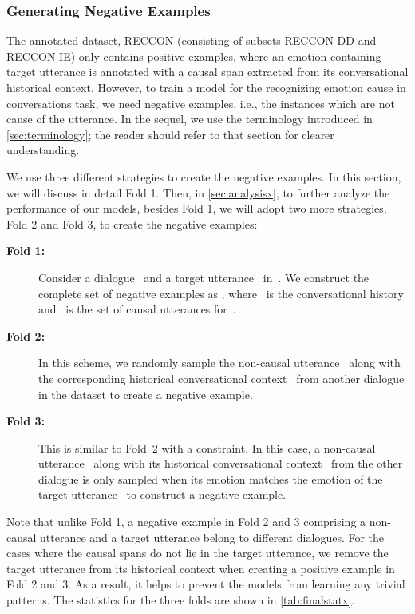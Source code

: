 \documentclass[smallextended]{svjour3}
\newcommand\RECCON{recognizing emotion cause in conversations} \newcommand\ECRIC{ECRIC}
\newcommand\RECCONDA{RECCON}
\newcommand\RECCONDADD{RECCON-DD}
\newcommand\RECCONDAIE{RECCON-IE}
\newcommand\0{\hphantom{0}}
\begin{document}
\subsubsection{Generating Negative Examples}
\label{sec:neg}
The annotated dataset, \RECCONDA{} (consisting of subsets \RECCONDADD{} and \RECCONDAIE{}) only contains positive examples, where an emotion-containing target utterance is annotated with a causal span extracted from its conversational historical context. However, to train a model for the \RECCON{} task, we need negative examples, i.e., the instances which are not cause of the utterance. In the sequel, we use the terminology introduced in \cref{sec:terminology}; the reader should 
refer to that section for clearer understanding.

We use three different strategies to create the negative examples.
In this section, we will discuss in detail Fold 1. Then, in \cref{sec:analysisx}, to further analyze the performance of our models, besides Fold 1, we will adopt two more strategies, Fold 2 and Fold 3, to create the negative examples:
\begin{description}
\item[\textbf{Fold 1:}] Consider a dialogue~ and a target utterance~ in~.
We construct the complete set of negative examples as 
,
where~ is the conversational history and~ is the set of causal utterances for~.
\item[\textbf{Fold 2:}] In this scheme, we randomly sample the non-causal utterance~ along with the corresponding historical conversational context~ from another dialogue in the dataset to create a negative example.
\item[\textbf{Fold 3:}] This is similar to Fold~2 with a constraint. In this case, a non-causal utterance~ along with its historical conversational context~ from the other dialogue is only sampled when its emotion matches the emotion of the target utterance~ to construct a negative example.
\end{description}
Note that unlike Fold 1, a negative example in Fold 2 and 3 comprising a non-causal utterance  and a target utterance  belong to different dialogues. For the cases where the causal spans do not lie in the target utterance, we remove the target utterance from its historical context when creating a positive example in Fold 2 and 3. As a result, it helps to prevent the models from learning any trivial patterns. The statistics for the three folds are shown in \cref{tab:finalstatx}.
\end{document}
